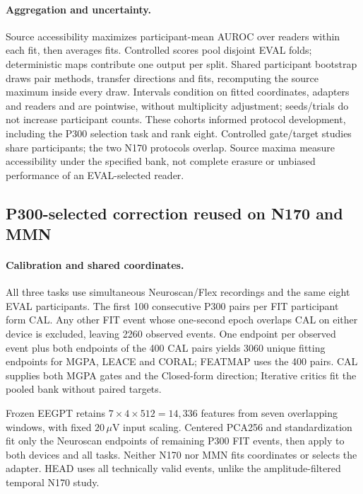 \paragraph{Aggregation and uncertainty.}
\label{app:evaluation-scope}
Source accessibility maximizes participant-mean AUROC over readers within
each fit, then averages fits. Controlled scores pool disjoint EVAL folds;
deterministic maps contribute one output per split. Shared participant
bootstrap draws pair methods, transfer directions and fits, recomputing
the source maximum inside every draw. Intervals condition on fitted
coordinates, adapters and readers and are pointwise, without multiplicity
adjustment; seeds/trials do not increase participant counts. These cohorts
informed protocol development, including the P300 selection task and rank
eight. Controlled gate/target studies share participants; the two N170
protocols overlap. Source maxima measure accessibility under the specified
bank, not complete erasure or unbiased performance of an EVAL-selected reader.

\subsection{P300-selected correction reused on N170 and MMN}
\label{app:recovery-protocol}
\label{app:reuse-protocol}
\paragraph{Calibration and shared coordinates.}
All three tasks use simultaneous Neuroscan/Flex recordings and the same
eight EVAL participants. The first 100 consecutive P300 pairs per FIT
participant form CAL. Any other FIT event whose one-second epoch overlaps
CAL on either device is excluded, leaving 2260 observed events. One endpoint
per observed event plus both endpoints of the 400 CAL pairs yields 3060
unique fitting endpoints for MGPA, LEACE and CORAL; FEATMAP uses the 400
pairs. CAL supplies both MGPA gates and the Closed-form direction;
Iterative critics fit the pooled bank without paired targets.

Frozen EEGPT retains $7\times4\times512=14{,}336$ features from seven
overlapping windows, with fixed $20\,\mu$V input scaling. Centered PCA256
and standardization fit only the Neuroscan endpoints of remaining P300 FIT
events, then apply to both devices and all tasks. Neither N170 nor MMN
fits coordinates or selects the adapter. HEAD uses all technically valid
events, unlike the amplitude-filtered temporal N170 study.

